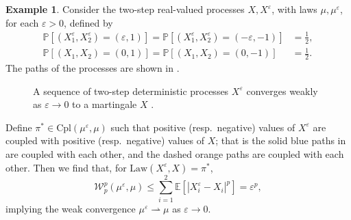 \documentclass[onseside, final]{amsart}
\theoremstyle{definition}
\newtheorem{example}[theorem]{Example}
\newcommand{\E}{\mathbb E}
\renewcommand{\P}{\mathbb P} %
\newcommand{\Law}{\mathrm{Law}}
\newcommand{\W}{\mathcal W}
\newcommand{\cpl}{\mathrm{Cpl}}
\numberwithin{equation}{section}
\begin{document}
		\begin{example}\label{ex:usual}
			Consider the two-step real-valued processes $X, X^\varepsilon$, with laws $\mu, \mu^\varepsilon$, for each $\varepsilon > 0$, defined by
			\begin{equation}
				\begin{split}
					\P[(X^\varepsilon_1, X^\varepsilon_2) = (\varepsilon, 1)] = \P[(X^\varepsilon_1, X^\varepsilon_2) = (-\varepsilon, -1)] & = \frac12,\\
					\P[(X_1, X_2) = (0, 1)] = \P[(X_1, X_2) = (0, -1)] & = \frac12.
				\end{split}
			\end{equation}
			The paths of the processes are shown in .
			\begin{figure}[h]
				\centering
{}
				\caption{A sequence of two-step deterministic processes $X^\varepsilon$ converges weakly as $\varepsilon \to 0$ to a martingale $X$ \citep[Figure 1]{BaBaBeEd19a}.}
				\label{fig:usual-example}
			\end{figure}
			Define $\pi^\ast \in \cpl(\mu^\varepsilon, \mu)$ such that positive (resp.~negative) values of $X^\varepsilon$ are coupled with  positive (resp.~negative) values of $X$; that is the solid blue paths in  are coupled with each other, and the dashed orange paths are coupled with each other. Then we find that, for $\Law(X^\varepsilon, X) = \pi^\ast$,
			\begin{equation}
				\W_p^p(\mu^\varepsilon, \mu) \leq \sum_{i = 1}^2\E[|X^\varepsilon_i - X_i|^p] = \varepsilon^p,
			\end{equation}
			implying the weak convergence $\mu^\varepsilon\rightharpoonup\mu$ as $\varepsilon \to 0$.
			

\end{example}
\end{document}
